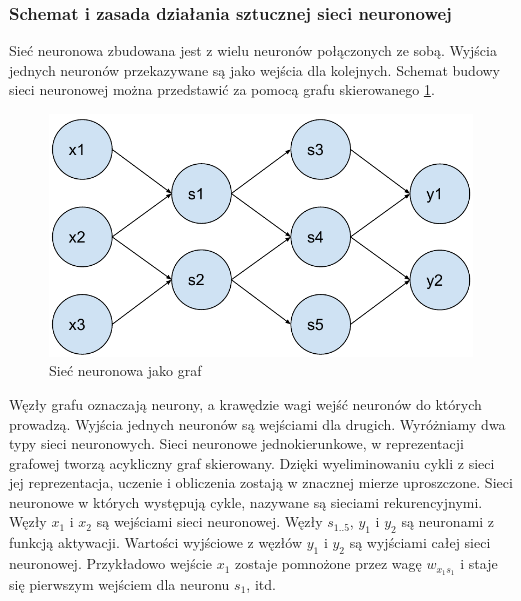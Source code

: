 \documentclass[a4paper,12pt,twoside,openany]{report}
\begin{document}
\begin{enumerate}
\subsubsection{Schemat i zasada działania sztucznej sieci neuronowej}
Sieć neuronowa zbudowana jest z wielu neuronów połączonych ze sobą.
Wyjścia jednych neuronów przekazywane są jako wejścia dla kolejnych.
Schemat budowy sieci neuronowej można przedstawić za pomocą grafu skierowanego \ref{rys:mlp:graf}.
\begin{figure}[h]
	\centering
	\includegraphics[width=\textwidth]{ann-graf}
	\caption{Sieć neuronowa jako graf}
	\label{rys:mlp:graf}
\end{figure}
Węzły grafu oznaczają neurony, a krawędzie wagi wejść neuronów do których prowadzą.
Wyjścia jednych neuronów są wejściami dla drugich.
Wyróżniamy dwa typy sieci neuronowych.
Sieci neuronowe jednokierunkowe, w reprezentacji grafowej tworzą acykliczny graf skierowany.
Dzięki wyeliminowaniu cykli z sieci jej reprezentacja, uczenie i obliczenia zostają w znacznej mierze uproszczone. 
Sieci neuronowe w których występują cykle, nazywane są sieciami rekurencyjnymi.
Węzły $x_1$ i $x_2$ są wejściami sieci neuronowej.
Węzły $s_{1..5}$, $y_1$ i $y_2$ są neuronami z funkcją aktywacji.
Wartości wyjściowe z węzłów $y_1$ i $y_2$ są wyjściami całej sieci neuronowej.
Przykładowo wejście $x_1$ zostaje pomnożone przez wagę $w_{x_1s_1}$ i staje się pierwszym wejściem dla neuronu $s_1$, itd.


\end{enumerate}
\end{document}
